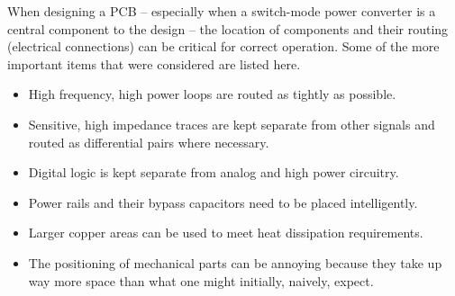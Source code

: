 When designing  a PCB --  especially when a  switch-mode power converter  is a
central  component to  the  design --  the location  of  components and  their
routing (electrical connections) can be  critical for correct operation.  Some
of the more important items that were considered are listed here.
\begin{itemize}
    \item
        High frequency, high power loops are routed as tightly as possible.
    \item
        Sensitive, high impedance traces are kept separate from other signals
        and routed as differential pairs where necessary.
    \item
        Digital logic is kept separate from analog and high power circuitry.
    \item
        Power rails and their bypass capacitors need to be placed intelligently.
    \item
        Larger copper areas can be used to meet heat dissipation requirements.
    \item
        The positioning of mechanical parts can be annoying because they take up
        way more space than what one might initially, naively, expect.
\end{itemize}


